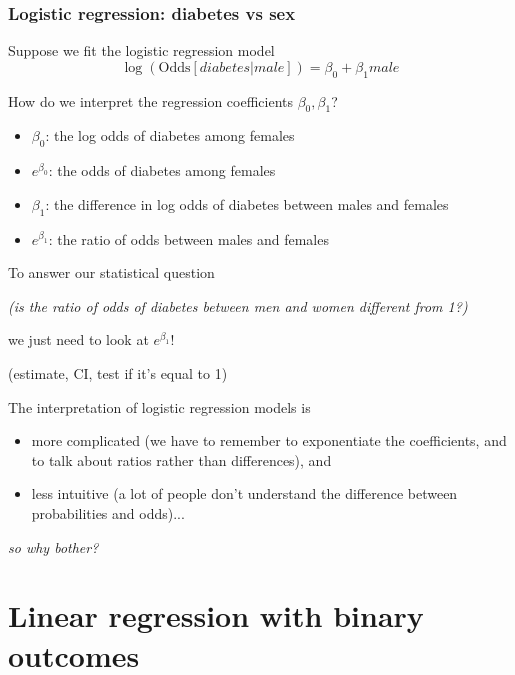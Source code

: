 \documentclass[12pt, 
hyperref={colorlinks=true, linkcolor=blue, urlcolor=cyan}]{beamer}
\begin{document}
\begin{frame}
\frametitle{Logistic regression: diabetes vs sex}

Suppose we fit the logistic regression model $$\log\left(\text{Odds}[diabetes | male]\right) = \beta_0 + \beta_1 male$$

\vspace{-0.2cm}

How do we interpret the regression coefficients $\beta_0, \beta_1$? \vspace{-0.3cm}
\begin{itemize}
\item $\beta_0$: \pause the log odds of diabetes among females \pause
\item[] \color{blue} $e^{\beta_0}$: the odds of diabetes among females \pause \color{black}
\item $\beta_1$: \pause the difference in log odds of diabetes between males and females \pause 
\item[] \color{blue} $e^{\beta_1}$: the ratio of odds between males and females \color{black}
\end{itemize}

\vspace{-0.2cm}
To answer our statistical question \begin{small}\textit{(is the ratio of odds of diabetes between men and women different from 1?)}\end{small} we just need to look at $e^{\beta_1}$! \begin{small} (estimate, CI, test if it's equal to 1) \end{small}
\end{frame}

\begin{frame}
The interpretation of logistic regression models is
\begin{itemize}
\item[] \color{blue} more complicated \color{black} (we have to remember to exponentiate the coefficients, and to talk about ratios rather than differences), and
\item[] \color{orange} less intuitive \color{black} (a lot of people don't understand the difference between probabilities and odds)...
\end{itemize}
\textit{so why bother?}
\end{frame}

\section{Linear regression with binary outcomes}
\end{document}
